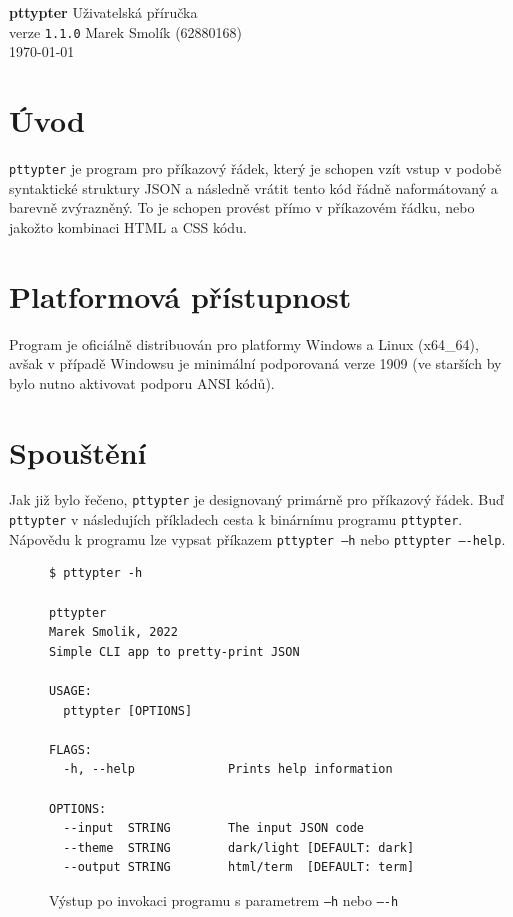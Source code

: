 \documentclass[11pt, letterpaper]{article}
\begin{document}
 
\begin{center}
\vfill
{\Huge \textbf{pttypter}}
\vfill
{\huge Uživatelská příručka} \\
{\large verze \texttt{1.1.0}}
\vfill
{\Large Marek Smolík (62880168)} \\
\today
\vfill
\end{center}

\newpage

\section{Úvod}
\texttt{pttypter} je program pro příkazový řádek, který je schopen vzít vstup v podobě syntaktické struktury JSON a následně vrátit tento kód řádně naformátovaný a barevně zvýrazněný. To je schopen provést přímo v příkazovém řádku, nebo jakožto kombinaci HTML a CSS kódu.

\section{Platformová přístupnost}
Program je oficiálně distribuován pro platformy Windows a Linux (x64\_64), avšak v případě Windowsu je minimální podporovaná verze 1909 (ve starších by bylo nutno aktivovat podporu ANSI kódů).

\section{Spouštění}
Jak již bylo řečeno, \texttt{pttypter} je designovaný primárně pro příkazový řádek. Buď \texttt{pttypter} v následujích příkladech cesta k binárnímu programu \texttt{pttypter}. Nápovědu k programu lze vypsat příkazem \texttt{pttypter --h} nebo \texttt{pttypter ----help}.


\begin{figure}[h]
    \begin{center}
        \begin{lstlisting}
$ pttypter -h

pttypter
Marek Smolik, 2022
Simple CLI app to pretty-print JSON

USAGE:
  pttypter [OPTIONS]

FLAGS:
  -h, --help             Prints help information

OPTIONS:
  --input  STRING        The input JSON code
  --theme  STRING        dark/light [DEFAULT: dark]
  --output STRING        html/term  [DEFAULT: term]
        \end{lstlisting}
    \end{center}
    \caption{Výstup po invokaci programu s parametrem \texttt{--h} nebo \texttt{----h}}
\end{figure}
\end{document}

